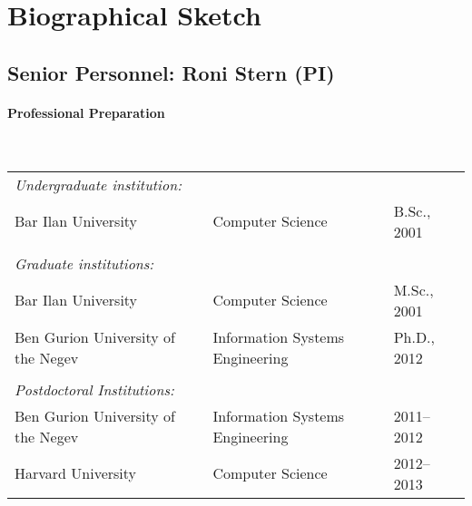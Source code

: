 \documentclass[12pt]{article}
\begin{document}
\section*{Biographical Sketch}

\subsection*{Senior Personnel: Roni Stern (PI)}
\paragraph{Professional Preparation}
\ \\
\begin{tabular}{lll}
{\em Undergraduate institution:}& & \\
Bar Ilan University &Computer Science&B.Sc., 2001\\
 & & \\
{\em Graduate institutions:}& & \\
Bar Ilan University &Computer Science&M.Sc., 2001\\
Ben Gurion University of the Negev&Information Systems Engineering&Ph.D., 2012\\
 & & \\
{\em Postdoctoral Institutions:}& & \\
Ben Gurion University of the Negev&Information Systems Engineering &2011--2012\\
Harvard University&Computer Science&2012--2013
\end{tabular}
\end{document}
